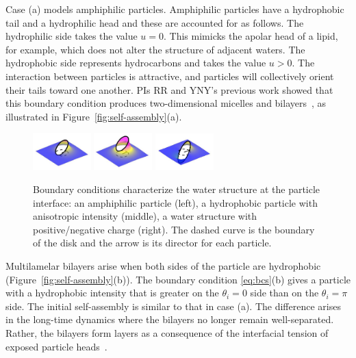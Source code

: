 Case (a) models amphiphilic particles.
Amphiphilic particles have a hydrophobic tail and a hydrophilic head
and these are accounted for as follows.
The hydrophilic side takes the value $u =0$.
This mimicks the apolar head of a lipid, for example, which does
not alter the structure of adjacent waters. The hydrophobic side
represents hydrocarbons and takes the value 
$u > 0$. The interaction between particles is attractive,
and particles will collectively orient their tails toward
one another. 
PIs RR and YNY's previous work showed that this   
boundary condition produces two-dimensional micelles and
bilayers~\cite{Fu2018_SIAM}, as illustrated in 
Figure~\ref{fig:self-assembly}(a).

\begin{figure}
  \vspace{-20pt}
  \begin{center}
  \includegraphics[width=0.2\textwidth]{figures/SpecificAim1/LPA.jpg}
  \includegraphics[width=0.2\textwidth]{figures/SpecificAim1/LPB.jpg}
  \includegraphics[width=0.2\textwidth]{figures/SpecificAim1/LPC.jpg}
  \end{center}
  \vspace{-20pt}  
  \caption{\label{fig:bcs} Boundary conditions characterize the water
    structure at the particle interface: an amphiphilic particle (left),
    a hydrophobic
  particle with anisotropic intensity (middle), a water structure with
  positive/negative charge (right). The dashed curve is the boundary of the
  disk and the arrow is its director for each particle.}
\end{figure}

Multilamelar bilayers arise when both sides of the particle
are hydrophobic (Figure~\ref{fig:self-assembly}(b)).
The boundary condition \eqref{eq:bcs}(b) 
gives a particle with a hydrophobic intensity that is greater
on the $\theta_i = 0$ side than on the $\theta_i = \pi$ side.
The initial self-assembly is similar to that in case (a).
The difference arises in the long-time dynamics where the bilayers
no longer remain well-separated. 
Rather, the bilayers form layers 
as a consequence of the interfacial tension of exposed particle
heads~\cite{Huetal19, deMeetal21}. 


